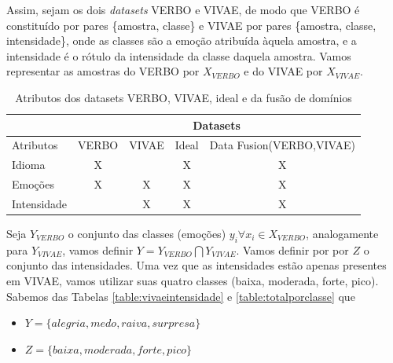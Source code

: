 Assim, sejam os dois \textit{datasets} VERBO e VIVAE, de modo que VERBO é constituído por pares \{amostra, classe\} e VIVAE por pares \{amostra, classe, intensidade\}, onde as classes são a emoção atribuída àquela amostra, e a intensidade é o rótulo da intensidade da classe daquela amostra. Vamos representar as amostras do VERBO por $X_{VERBO}$ e do VIVAE por $X_{VIVAE}$.

\begin{table}[]
\centering
\caption{Atributos dos datasets VERBO, VIVAE, ideal e da fusão de domínios}
\begin{tabular}{l|cccc|}
\cline{2-5}
 & \multicolumn{4}{c|}{Datasets} \\ \hline
\multicolumn{1}{|l|}{Atributos} & \multicolumn{1}{c|}{VERBO} & \multicolumn{1}{c|}{VIVAE} & \multicolumn{1}{c|}{Ideal} & Data Fusion(VERBO,VIVAE) \\ \hline
\multicolumn{1}{|l|}{Idioma} & \multicolumn{1}{c|}{X} & \multicolumn{1}{c|}{} & \multicolumn{1}{c|}{X} & X \\ \hline
\multicolumn{1}{|l|}{Emoções} & \multicolumn{1}{c|}{X} & \multicolumn{1}{c|}{X} & \multicolumn{1}{c|}{X} & X \\ \hline
\multicolumn{1}{|l|}{Intensidade} & \multicolumn{1}{c|}{} & \multicolumn{1}{c|}{X} & \multicolumn{1}{c|}{X} & X \\ \hline
\end{tabular}\label{table:datasetideal}
\end{table}

Seja $Y_{VERBO}$ o conjunto das classes (emoções) $y_i \forall x_i \in X_{VERBO}$, analogamente para $Y_{VIVAE}$, vamos definir $Y = Y_{VERBO} \bigcap Y_{VIVAE}$. Vamos definir por por $Z$ o conjunto das intensidades. Uma vez que as intensidades estão apenas presentes em \acrshort{VIVAE}, vamos utilizar suas quatro classes (baixa, moderada, forte, pico). Sabemos das Tabelas \ref{table:vivaeintensidade} e \ref{table:totalporclasse} que

\begin{itemize}
    \item $Y = \{alegria, medo, raiva, surpresa\}$
    \item $Z = \{baixa, moderada, forte, pico\}$
\end{itemize}



